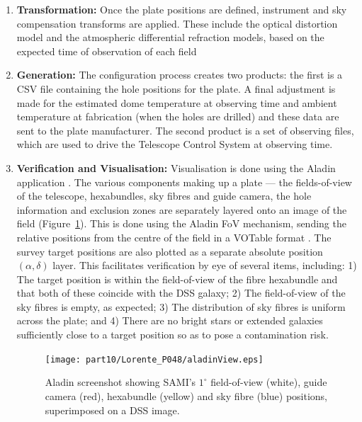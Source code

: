 \begin{enumerate}
\item{\bf Transformation:} Once the plate positions are defined, instrument and sky compensation transforms are applied. These include the optical distortion model and the atmospheric differential refraction models, based on the expected time of observation of each field

\item{\bf Generation:} The configuration process creates two products: the first is a CSV file containing the hole positions for the plate. A final adjustment is made for the estimated dome temperature at observing time and ambient temperature at fabrication (when the holes are drilled) and these data are sent to the plate manufacturer. The second product is a set of observing files, which are used to drive the Telescope Control System at observing time.

\item{\bf Verification and Visualisation:} Visualisation is done using the Aladin application \citep{2000bfb+}. The various components making up a plate --- the fields-of-view of the telescope, hexabundles, sky fibres and guide camera, the hole information and exclusion zones are separately layered onto an image of the field (Figure~\ref{p048_FigAladin}). This is done using the Aladin FoV mechanism, sending the relative positions from the centre of the field in a VOTable format \citep{2011owd+}. The survey target positions are also plotted as a separate absolute position $(\alpha, \delta)$ layer. This facilitates  verification by eye of several items, including: 1) The target position is within the field-of-view of the fibre  hexabundle and that both of these coincide with the DSS galaxy; 2) The field-of-view of the sky fibres is empty, as expected; 3) The distribution of sky fibres is uniform across the plate; and 4) There are no bright stars or extended galaxies sufficiently close to a target position so as to pose a contamination risk.

\begin{figure}[ht]
\centering
\texttt{[image: part10/Lorente\_P048/aladinView.eps]}
\caption{Aladin screenshot showing SAMI's $1^\circ$ field-of-view (white), guide camera (red), hexabundle (yellow)  and sky fibre (blue) positions, superimposed on a DSS image.}
\label{p048_FigAladin}
\end{figure}

\end{enumerate}


